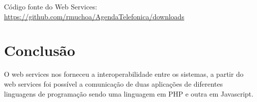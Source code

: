 \documentclass{acm_proc_article-sp}
\begin{document}
	Código fonte do Web Services: \url{https://github.com/rmuchoa/AgendaTelefonica/downloads}
	
	
\section{Conclusão}
	
	O web services nos forneceu a interoperabilidade entre os sistemas, a partir do web services foi possível a comunicação de duas aplicações de diferentes linguagens de programação sendo uma linguagem em PHP e outra em Javascript.



%

%
%
\end{document}
